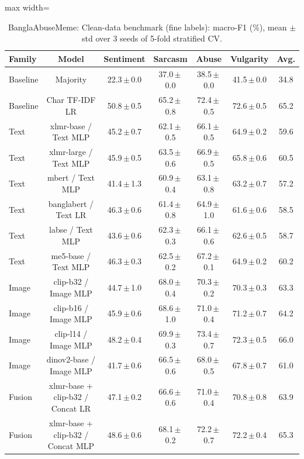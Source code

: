 \begin{table}[t]
\centering
\small
\caption{BanglaAbuseMeme: Clean-data benchmark (fine labels): macro-F1 (\%), mean $\pm$ std over 3 seeds of 5-fold stratified CV.}
\label{tab:bench_fine_banglaabusememe}
\begin{adjustbox}{max width=\textwidth}
\begin{tabular}{lcccccc}
\toprule
Family & Model & Sentiment & Sarcasm & Abuse & Vulgarity & Avg. \\
\midrule
Baseline & Majority & 22.3\,$\pm$\,0.0 & 37.0\,$\pm$\,0.0 & 38.5\,$\pm$\,0.0 & 41.5\,$\pm$\,0.0 & 34.8 \\
Baseline & Char TF-IDF LR & 50.8\,$\pm$\,0.5 & 65.2\,$\pm$\,0.8 & 72.4\,$\pm$\,0.5 & 72.6\,$\pm$\,0.5 & 65.2 \\
Text & xlmr-base / Text MLP & 45.2\,$\pm$\,0.7 & 62.1\,$\pm$\,0.5 & 66.1\,$\pm$\,0.5 & 64.9\,$\pm$\,0.2 & 59.6 \\
Text & xlmr-large / Text MLP & 45.9\,$\pm$\,0.5 & 63.5\,$\pm$\,0.6 & 66.9\,$\pm$\,0.5 & 65.8\,$\pm$\,0.6 & 60.5 \\
Text & mbert / Text MLP & 41.4\,$\pm$\,1.3 & 60.9\,$\pm$\,0.4 & 63.1\,$\pm$\,0.8 & 63.2\,$\pm$\,0.7 & 57.2 \\
Text & banglabert / Text LR & 46.3\,$\pm$\,0.6 & 61.4\,$\pm$\,0.8 & 64.9\,$\pm$\,1.0 & 61.6\,$\pm$\,0.6 & 58.5 \\
Text & labse / Text MLP & 43.6\,$\pm$\,0.6 & 62.3\,$\pm$\,0.3 & 66.1\,$\pm$\,0.6 & 62.6\,$\pm$\,0.5 & 58.7 \\
Text & me5-base / Text MLP & 46.3\,$\pm$\,0.3 & 62.5\,$\pm$\,0.2 & 67.2\,$\pm$\,0.1 & 64.9\,$\pm$\,0.2 & 60.2 \\
Image & clip-b32 / Image MLP & 44.7\,$\pm$\,1.0 & 68.0\,$\pm$\,0.4 & 70.3\,$\pm$\,0.2 & 70.3\,$\pm$\,0.3 & 63.3 \\
Image & clip-b16 / Image MLP & 45.9\,$\pm$\,0.6 & 68.6\,$\pm$\,1.0 & 71.0\,$\pm$\,0.4 & 71.2\,$\pm$\,0.7 & 64.2 \\
Image & clip-l14 / Image MLP & 48.2\,$\pm$\,0.4 & 69.9\,$\pm$\,0.3 & 73.4\,$\pm$\,0.7 & 72.3\,$\pm$\,0.5 & 66.0 \\
Image & dinov2-base / Image MLP & 41.7\,$\pm$\,0.6 & 66.5\,$\pm$\,0.6 & 68.0\,$\pm$\,0.5 & 67.8\,$\pm$\,0.7 & 61.0 \\
Fusion & xlmr-base + clip-b32 / Concat LR & 47.1\,$\pm$\,0.2 & 66.6\,$\pm$\,0.6 & 71.0\,$\pm$\,0.4 & 70.8\,$\pm$\,0.8 & 63.9 \\
Fusion & xlmr-base + clip-b32 / Concat MLP & 48.6\,$\pm$\,0.6 & 68.1\,$\pm$\,0.2 & 72.2\,$\pm$\,0.7 & 72.2\,$\pm$\,0.4 & 65.3 \\

\end{tabular}
\end{adjustbox}
\end{table}
